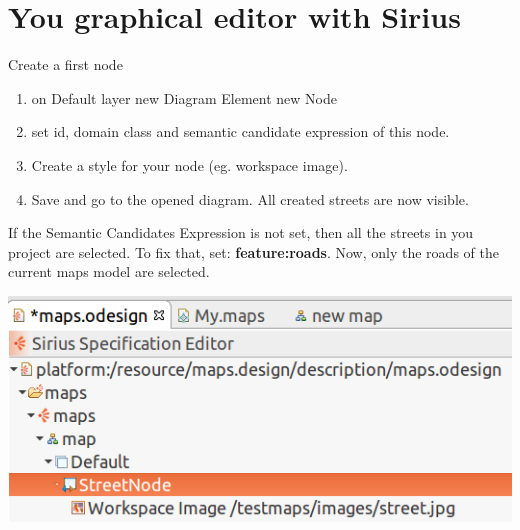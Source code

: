 \section{You graphical editor with Sirius}

\begin{frame}[allowframebreaks]{Create a first node}


	\begin{enumerate}
		\item on Default layer \ra new Diagram Element \ra new Node
		\item set id, domain class and semantic candidate expression of this node.
		\item Create a style for your node (eg. workspace image).
		\item Save and go to the opened diagram. All created streets are now visible.				
	\end{enumerate}	

	\framebreak

	If the Semantic Candidates Expression is not set, then all the streets in you project are selected. To fix that, set: {\bf feature:roads}. Now, only the roads of the current maps model are selected.

	\centering
	\includegraphics[scale=0.3]{figs/streetNode.png}

\end{frame}

